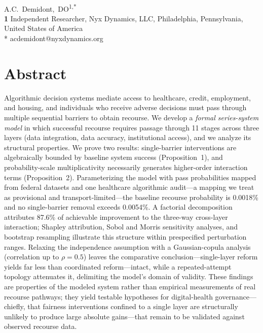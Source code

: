 \documentclass[10pt,letterpaper]{article}
\begin{document}
\vspace*{0.2in}

\begin{flushleft}
{\Large
\textbf{}
}
\newline
\\
A.C.\ Demidont,\ DO\textsuperscript{1,*}
\\
\bigskip
\textbf{1} Independent Researcher, Nyx Dynamics, LLC, Philadelphia, Pennsylvania, United States of America
\\
\bigskip
* acdemidont@nyxdynamics.org
\end{flushleft}

\section*{Abstract}
Algorithmic decision systems mediate access to healthcare, credit, employment, and housing, and individuals who receive adverse decisions must pass through multiple sequential barriers to obtain recourse. We develop a \emph{formal series-system model} in which successful recourse requires passage through 11 stages across three layers (data integration, data accuracy, institutional access), and we analyze its structural properties. We prove two results: single-barrier interventions are algebraically bounded by baseline system success (Proposition~1), and probability-scale multiplicativity necessarily generates higher-order interaction terms (Proposition~2). Parameterizing the model with pass probabilities mapped from federal datasets and one healthcare algorithmic audit---a mapping we treat as provisional and transport-limited---the baseline recourse probability is 0.0018\% and no single-barrier removal exceeds 0.0054\%. A factorial decomposition attributes 87.6\% of achievable improvement to the three-way cross-layer interaction; Shapley attribution, Sobol and Morris sensitivity analyses, and bootstrap resampling illustrate this structure within prespecified perturbation ranges. Relaxing the independence assumption with a Gaussian-copula analysis (correlation up to $\rho=0.5$) leaves the comparative conclusion---single-layer reform yields far less than coordinated reform---intact, while a repeated-attempt topology attenuates it, delimiting the model's domain of validity. These findings are properties of the modeled system rather than empirical measurements of real recourse pathways; they yield testable hypotheses for digital-health governance---chiefly, that fairness interventions confined to a single layer are structurally unlikely to produce large absolute gains---that remain to be validated against observed recourse data.
\end{document}
